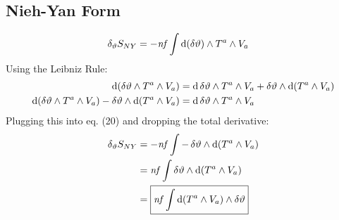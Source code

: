 \documentclass[12pt]{article}
\begin{document}
\subsection{Nieh-Yan Form}
\begin{align}
  \var_\vartheta{S_{NY}} &= -\mathit{nf} \int \dd(\var{\vartheta}) \wedge T^a \wedge V_a
\end{align}
Using the Leibniz Rule:
\begin{align*}
  \dd(\var{\vartheta} \wedge T^a \wedge V_a) &= \dd{\var{\vartheta}} \wedge T^a \wedge V_a + \var{\vartheta} \wedge \dd(T^a \wedge V_a) \\
  \dd(\var{\vartheta} \wedge T^a \wedge V_a) - \var{\vartheta} \wedge \dd(T^a \wedge V_a) &= \dd{\var{\vartheta}} \wedge T^a \wedge V_a
\end{align*}
Plugging this into eq. (20) and dropping the total derivative:
\begin{align}
  \var_\vartheta{S_{NY}} &= -\mathit{nf} \int -\var{\vartheta} \wedge \dd(T^a \wedge V_a) \nonumber \\
  &= \mathit{nf} \int \var{\vartheta} \wedge \dd(T^a \wedge V_a) \nonumber \\
  &= \boxed{\mathit{nf} \int \dd(T^a \wedge V_a) \wedge \var{\vartheta}}
\end{align}
\end{document}
